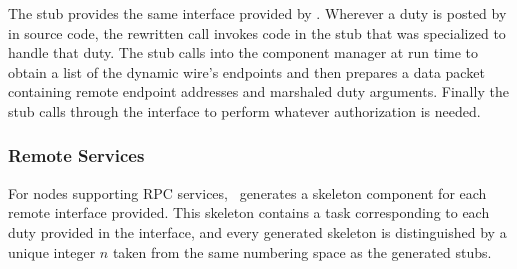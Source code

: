 The  stub provides the same interface provided by
. Wherever a duty is posted by
 in source code, the rewritten call invokes code
in the stub that was specialized to handle that duty. The stub calls
into the component manager at run time to obtain a list of the dynamic
wire's endpoints and then prepares a data packet containing remote
endpoint addresses and marshaled duty arguments. Finally the stub calls
through the  interface to perform whatever
authorization is needed.

\subsubsection{Remote Services}

For nodes supporting RPC services, \Sprocket\ generates a skeleton
component for each remote interface provided.
This skeleton contains a task corresponding to each duty provided in the interface,
and every generated skeleton is distinguished by a unique integer $n$
taken from the same numbering space as the generated stubs.

%
%
%

